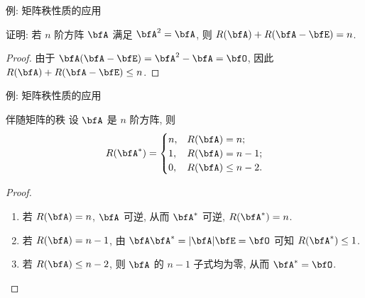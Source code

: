 \begin{frame}{例: 矩阵秩性质的应用}
	\onslide<+->
	\begin{example}
		证明: 若 $n$ 阶方阵 $\bfA$ 满足 $\bfA^2=\bfA$, 则 $R(\bfA)+R(\bfA-\bfE)=n$.
	\end{example}
	\onslide<+->
	\begin{proof}
		由于 $\bfA(\bfA-\bfE)=\bfA^2-\bfA=\bfO$, 因此 $R(\bfA)+R(\bfA-\bfE)\le n$.
		\onslide<+->{%
			故 $R(\bfA)+R(\bfA-\bfE)=n$.\qedhere
		}
	\end{proof}
\end{frame}


\begin{frame}{例: 矩阵秩性质的应用}
	\onslide<+->
	\begin{second}{伴随矩阵的秩}
		设 $\bfA$ 是 $n$ 阶方阵, 则
		\[R(\bfA^*)=\begin{cases}
			n,&R(\bfA)=n;\\
			1,&R(\bfA)=n-1;\\
			0,&R(\bfA)\le n-2.
		\end{cases}\]
	\end{second}
	\onslide<+->
	\begin{proof}
		\begin{enumerate}
			\item 若 $R(\bfA)=n$, $\bfA$ 可逆, 从而 $\bfA^*$ 可逆, $R(\bfA^*)=n$.
			\item 若 $R(\bfA)=n-1$, 由 $\bfA\bfA^*=|\bfA|\bfE=\bfO$ 可知 $R(\bfA^*)\le 1$.
			\onslide<+->{故 $R(\bfA^*)=1$.}
			\item 若 $R(\bfA)\le n-2$, 则 $\bfA$ 的 $n-1$ 子式均为零, 从而 $\bfA^*=\bfO$.\qedhere
		\end{enumerate}
	\end{proof}
\end{frame}


